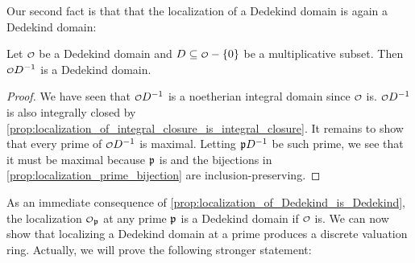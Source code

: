     Our second fact is that that the localization of a Dedekind domain is again a Dedekind domain:

    \begin{proposition}\label{prop:localization_of_Dedekind_is_Dedekind}
      Let $\smc{O}$ be a Dedekind domain and $D \subseteq \smc{O}-\{0\}$ be a multiplicative subset. Then $\smc{O}D^{-1}$ is a Dedekind domain.
    \end{proposition}
    \begin{proof}
      We have seen that $\smc{O}D^{-1}$ is a noetherian integral domain since $\smc{O}$ is. $\smc{O}D^{-1}$ is also integrally closed by \cref{prop:localization_of_integral_closure_is_integral_closure}. It remains to show that every prime of $\smc{O}D^{-1}$ is maximal. Letting $\mathfrak{p}D^{-1}$ be such prime, we see that it must be maximal because $\mathfrak{p}$ is and the bijections in \cref{prop:localization_prime_bijection} are inclusion-preserving.
    \end{proof}

    As an immediate consequence of \cref{prop:localization_of_Dedekind_is_Dedekind}, the localization $\smc{O}_{\mf{p}}$ at any prime $\mathfrak{p}$ is a Dedekind domain if $\smc{O}$ is. We can now show that localizing a Dedekind domain at a prime produces a discrete valuation ring. Actually, we will prove the following stronger statement:

